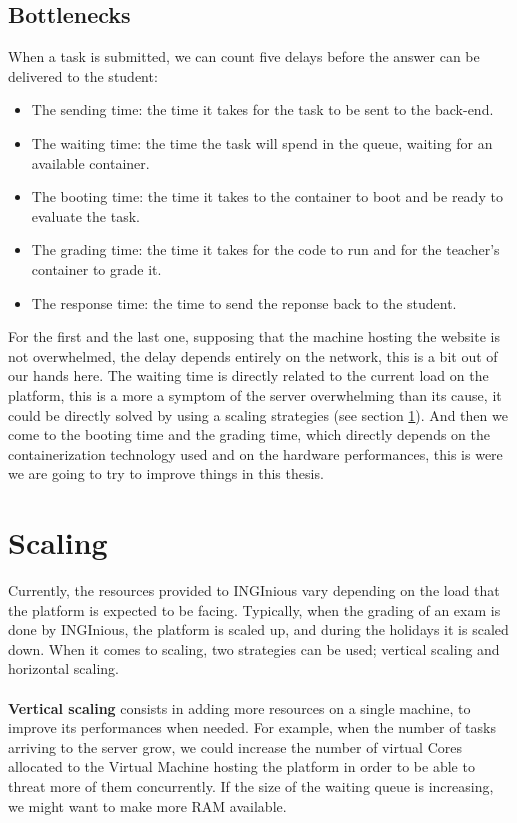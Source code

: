 \subsection{Bottlenecks}
When a task is submitted, we can count five delays before the answer can be delivered to the student:
\begin{itemize}
  \item The sending time: the time it takes for the task to be sent to the back-end.
  \item The waiting time: the time the task will spend in the queue, waiting for an available container.
  \item The booting time: the time it takes to the container to boot and be ready to evaluate the task.
  \item The grading time: the time it takes for the code to run and for the teacher's container to grade it.
  \item The response time: the time to send the reponse back to the student.
\end{itemize}
For the first and the last one, supposing that the machine hosting the website is not overwhelmed, the delay depends entirely on the network, this is a bit out of our hands here.  The waiting time is directly related to the current load on the platform, this is a more a symptom of the server overwhelming than its cause, it could be directly solved by using a scaling strategies (see section \ref{section:scaling}).  And then we come to the booting time and the grading time, which directly depends on the containerization technology used and on the hardware performances, this is were we are going to try to improve things in this thesis.

\section{Scaling} \label{section:scaling}
Currently, the resources provided to INGInious vary depending on the load that the platform is expected to be facing.  Typically, when the grading of an exam is done by INGInious, the platform is scaled up, and during the holidays it is scaled down.  When it comes to scaling, two strategies can be used; vertical scaling and horizontal scaling.

\paragraph{} \textbf{Vertical scaling} consists in adding more resources on a single machine, to improve its performances when needed.  For example, when the number of tasks arriving to the server grow, we could increase the number of virtual Cores allocated to the Virtual Machine hosting the platform in order to be able to threat more of them concurrently.  If the size of the waiting queue is increasing, we might want to make more RAM available.

